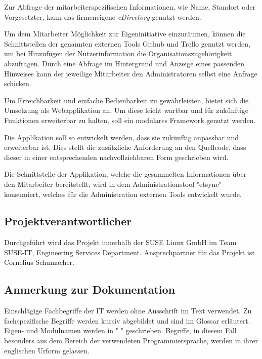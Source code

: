 Zur Abfrage der mitarbeiterspezifischen Informationen, wie Name, Standort oder Vorgesetzter, kann
das firmeneigene \textit{eDirectory} genutzt werden.

Um dem Mitarbeiter Möglichkeit zur Eigeninitiative einzuräumen, können die Schnittstellen der
genannten externen Tools Github und Trello genutzt werden, um bei Hinzufügen der Nutzerinformation
die Organisationszugehörigkeit abzufragen. Durch eine Abfrage im Hintergrund und Anzeige eines
passenden Hinweises kann der jeweilige Mitarbeiter den Administratoren selbst eine Anfrage schicken.

Um Erreichbarkeit und einfache Bedienbarkeit zu gewährleisten, bietet sich die Umsetzung als
Webapplikation an. Um diese leicht wartbar und für zukünftige Funktionen erweiterbar zu halten, soll
ein modulares Framework genutzt werden.

Die Applikation soll so entwickelt werden, dass sie zukünftig anpassbar und erweiterbar ist. Dies
stellt die zusätzliche Anforderung an den Quellcode, dass dieser in einer entsprechenden nachvollziehbaren
Form geschrieben wird.

Die Schnittstelle der Applikation, welche die gesammelten Informationen über den Mitarbeiter
bereitstellt, wird in dem Administrationstool "etsync" konsumiert, welches für die Administration
externen Tools entwickelt wurde.

\subsection{Projektverantwortlicher}
\label{sec:Projektverantwortlicher}
Durchgeführt wird das Projekt innerhalb der SUSE Linux GmbH im Team SUSE-IT, Engineering Services
Department. Ansprechpartner für das Projekt ist Cornelius Schumacher.

\subsection{Anmerkung zur Dokumentation}
\label{sec:Anmerkung zur Dokumentation}
Einschlägige Fachbegriffe der IT werden ohne Ausschrift im Text verwendet. Zu fachspezifische
Begriffe werden kursiv abgebildet und sind im Glossar erläutert. Eigen- und Modulnamen werden in " "
geschrieben. Begriffe, in diesem Fall besonders aus dem Bereich der verwendeten Programmiersprache,
werden in ihrer englischen Urform gelassen.
\pagebreak
